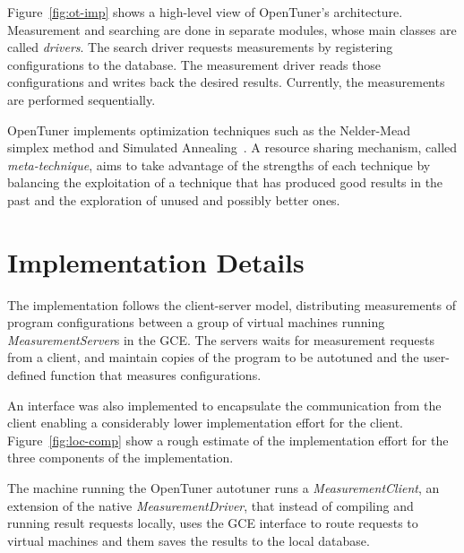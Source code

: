 \documentclass[a4paper, 12pt]{article}
\begin{document}
Figure~\ref{fig:ot-imp} shows a high-level view of OpenTuner's architecture.
Measurement and searching are done in separate modules, whose main classes are
called \emph{drivers}. The search driver requests measurements by registering
configurations to the database. The measurement driver reads those
configurations and writes back the desired results.  Currently, the
measurements are performed sequentially.

OpenTuner implements optimization techniques such as the
Nelder-Mead~\cite{nelder1965simplex} simplex method and Simulated
Annealing~\cite{kirkpatrick1983optimization}. A resource sharing mechanism,
called \emph{meta-technique}, aims to take advantage of the strengths of each
technique by balancing the exploitation of a technique that has produced good
results in the past and the exploration of unused and possibly better ones.


\section{Implementation Details}
\label{sec:ext}

The implementation follows the client-server model, distributing
measurements of program configurations between a group of virtual
machines running \emph{MeasurementServer}s in the GCE. The servers
waits for measurement requests from a client, and maintain copies
of the program to be autotuned and the user-defined function that
measures configurations.

An interface was also implemented to encapsulate the communication
from the client enabling a considerably lower implementation
effort for the client. Figure~\ref{fig:loc-comp} show a rough
estimate of the implementation effort for the three components
of the implementation.

The machine running the OpenTuner autotuner runs a \emph{MeasurementClient},
an extension of the native \emph{MeasurementDriver}, that instead of
compiling and running result requests locally, uses the GCE interface to
route requests to virtual machines and them saves the results to the local
database.
\end{document}
